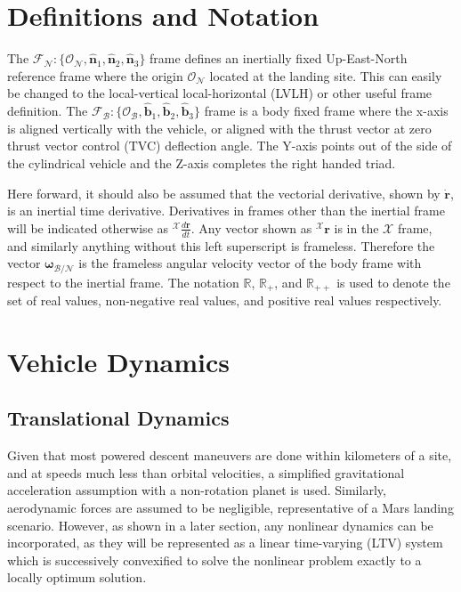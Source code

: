 \documentclass[conf]{new-aiaa}
\begin{document}
\section{Definitions and Notation}

The $\mathcal{F}_\mathcal{N} : \{\mathcal{O}_\mathcal{N}, \hat{\bm{n}}_1, \hat{\bm{n}}_2, \hat{\bm{n}}_3 \}$ frame defines an inertially fixed Up-East-North reference frame where the origin $\mathcal{O}_\mathcal{N}$ located at the landing site. This can easily be changed to the local-vertical local-horizontal (LVLH) or other useful frame definition. The $\mathcal{F}_\mathcal{B}: \{\mathcal{O}_\mathcal{B}, \hat{\bm{b}}_1, \hat{\bm{b}}_2, \hat{\bm{b}}_3 \}$ frame is a body fixed frame where the x-axis is aligned vertically with the vehicle, or aligned with the thrust vector at zero thrust vector control (TVC) deflection angle. The Y-axis points out of the side of the cylindrical vehicle and the Z-axis completes the right handed triad.

Here forward, it should also be assumed that the vectorial derivative, shown by $\mathbf{\dot{r}}$, is an inertial time derivative. Derivatives in frames other than the inertial frame will be indicated otherwise as $^\mathcal{X}\frac{d \mathbf{r}}{dt}$. Any vector shown as $^\mathcal{X}\mathbf{r}$ is in the $\mathcal{X}$ frame, and similarly anything without this left superscript is frameless. Therefore the vector $\bm{\omega}_{\mathcal{B/N}}$ is the frameless angular velocity vector of the body frame with respect to the inertial frame. The notation $\mathbb{R}$, $\mathbb{R}_+$, and $\mathbb{R}_{++}$ is used to denote the set of real values, non-negative real values, and positive real values respectively.


\section{Vehicle Dynamics}
\subsection{Translational Dynamics}
Given that most powered descent maneuvers are done within kilometers of a site, and at speeds much less than orbital velocities, a simplified gravitational acceleration assumption with a non-rotation planet is used. Similarly, aerodynamic forces are assumed to be negligible, representative of a Mars landing scenario. However, as shown in a later section, any nonlinear dynamics can be incorporated, as they will be represented as a linear time-varying (LTV) system which is successively convexified to solve the nonlinear problem exactly to a locally optimum solution.
\end{document}
